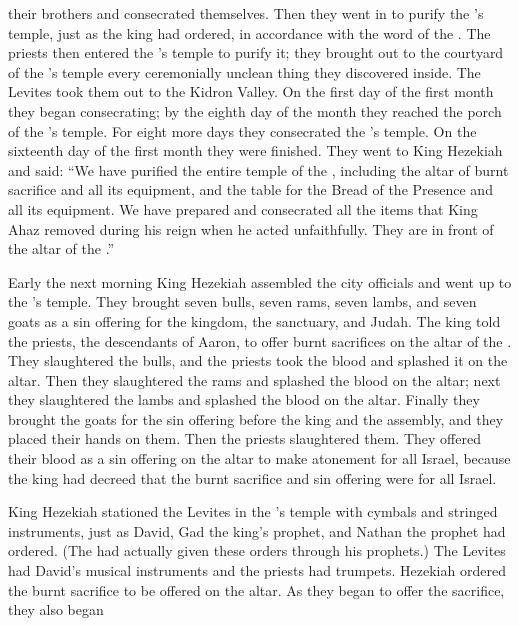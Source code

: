 {their brothers
and consecrated
themselves. Then they went
in to purify
the
{}’s
temple,
just as the king
had ordered,
in accordance with the word
of the {}.
The priests
then entered
the
{}’s
temple
to purify
it; they brought out
to the
courtyard
of the
{}’s
temple
every
ceremonially unclean thing
they discovered
inside.
The Levites
took
them out
to the Kidron
Valley.
On the first
day of the first
month
they
began
consecrating;
by the eighth
day
of the month
they reached
the porch
of the
{}’s
temple.
For eight
more days
they consecrated
the
{}’s
temple.
On the sixteenth
day
of the first
month
they were
finished.
They went
to
King
Hezekiah
and said: “We have purified
the
entire
temple
of the {}, including the
altar
of burnt sacrifice
and all
its equipment,
and the
table
for the Bread of the Presence
and all
its equipment.
We
have prepared
and consecrated
all
the items
that
King
Ahaz
removed during his reign
when he acted unfaithfully.
They are in front
of the altar
of the {}.”
\par }{\PP {}Early
the next morning King
Hezekiah
assembled
the city
officials
and went up
to the
{}’s
temple.
They brought
seven
bulls,
seven
rams,
seven
lambs,
and seven
goats
as a sin offering
for
the kingdom,
the sanctuary,
and Judah.
The king told
the priests,
the descendants
of Aaron,
to offer
burnt sacrifices on
the altar
of the {}.
They slaughtered
the bulls,
and the priests
took
the
blood
and splashed
it on the altar.
Then they slaughtered
the rams
and splashed
the blood
on the altar;
next they slaughtered
the lambs
and splashed
the blood
on the altar.
Finally
they brought the goats
for the sin offering
before
the king
and the assembly,
and they placed
their hands
on them.
Then the priests
slaughtered
them. They offered
their blood
as a sin
offering on
the altar
to make atonement
for
all
Israel,
because
the king
had decreed that the burnt sacrifice
and sin offering
were for
all
Israel.
\par }{\PP {}King Hezekiah stationed
the Levites
in the
{}’s
temple
with cymbals
and stringed instruments,
just as David,
Gad
the king’s
prophet,
and Nathan
the prophet
had ordered.
(The
{}
had actually given these orders
through
his prophets.)
The Levites
had David’s
musical
instruments
and the priests
had trumpets.
Hezekiah
ordered
the burnt sacrifice
to be offered
on the altar.
As they began
to offer the sacrifice,
they also began
}
